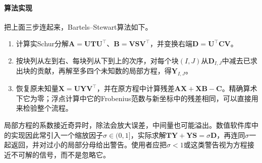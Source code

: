 \paragraph{算法实现}
把上面三步连起来，Bartels--Stewart算法如下。
\begin{enumerate}
 \item 计算实Schur分解$\bm A=\bm U\bm T\bm U^\top$、$\bm B=\bm V\bm S\bm V^\top$，并变换右端$\bm D=\bm U^\top\bm C\bm V$。
 \item 按块列从左到右、每块列从下到上的次序，对每个块$(I,J)$从$\bm D_{I,J}$中减去已求出块的贡献，再解至多四个未知数的局部方程，得$\bm Y_{I,J}$。
 \item 恢复原未知量$\bm X=\bm U\bm Y\bm V^\top$，并在原方程中计算残差$\bm A\bm X+\bm X\bm B-\bm C$。精确算术下它为零；浮点计算中它的Frobenius范数与新坐标中的残差相同，可以直接用来检验整个流程。
\end{enumerate}
局部方程的系数接近奇异时，除法会放大误差，中间量也可能溢出。数值软件库中的实现因此常引入一个缩放因子$\sigma\in(0,1]$，实际求解$\bm T\bm Y+\bm Y\bm S=\sigma\bm D$，再连同$\sigma$一起返回，并对过小的局部分母给出警告。使用者应把$\sigma<1$或这类警告视为方程接近不可解的信号，而不是忽略它。

